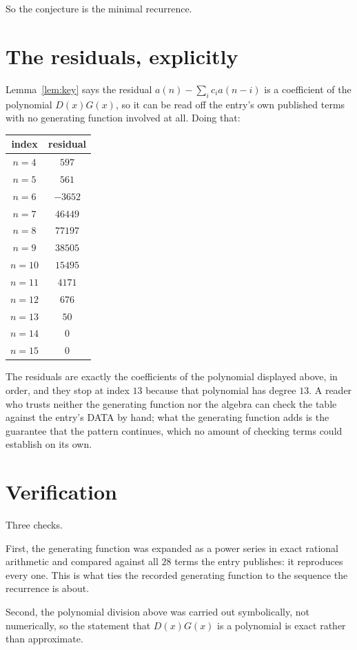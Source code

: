 \documentclass[11pt,a4paper]{article}
\theoremstyle{plain}
\theoremstyle{definition}
\begin{document}
So the conjecture is the minimal recurrence.

\section{The residuals, explicitly}

Lemma~\ref{lem:key} says the residual $a(n)-\sum_ic_ia(n-i)$ is a coefficient of the
polynomial $D(x)G(x)$, so it can be read off the entry's own published terms with no
generating function involved at all. Doing that:
\begin{center}
\begin{tabular}{cc}
index & residual \\ \hline
$n=4$ & $597$ \\
$n=5$ & $561$ \\
$n=6$ & $-3652$ \\
$n=7$ & $46449$ \\
$n=8$ & $77197$ \\
$n=9$ & $38505$ \\
$n=10$ & $15495$ \\
$n=11$ & $4171$ \\
$n=12$ & $676$ \\
$n=13$ & $50$ \\
$n=14$ & $0$ \\
$n=15$ & $0$
\end{tabular}
\end{center}
The residuals are exactly the coefficients of the polynomial displayed above, in order, and
they stop at index $13$ because that polynomial has degree $13$. A reader who trusts
neither the generating function nor the algebra can check the table against the entry's DATA
by hand; what the generating function adds is the guarantee that the pattern continues, which
no amount of checking terms could establish on its own.

\section{Verification}

Three checks.

First, the generating function was expanded as a power series in exact rational arithmetic and
compared against all $28$ terms the entry publishes: it reproduces every one. This is
what ties the recorded generating function to the sequence the recurrence is about.

Second, the polynomial division above was carried out symbolically, not numerically, so the
statement that $D(x)G(x)$ is a polynomial is exact rather than approximate.
\end{document}
